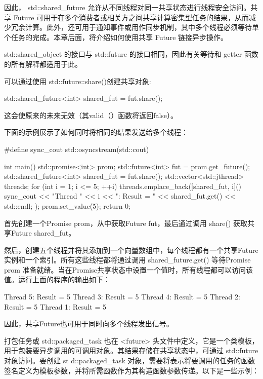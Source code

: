 因此， std::shared\_future 允许从不同线程对同一共享状态进行线程安全访问。共享 Future 可用于在多个消费者或相关方之间共享计算密集型任务的结果，从而减少冗余计算。此外，还可用于通知事件或用作同步机制，其中多个线程必须等待单个任务的完成。本章后面，将介绍如何使用共享 Future 链接异步操作。

std::shared\_object 的接口与 std::future 的接口相同，因此有关等待和 getter 函数的所有解释都适用于此。

可以通过使用 std::future::share()创建共享对象:

\begin{cpp}
std::shared_future<int> shared_fut = fut.share();
\end{cpp}

这会使原来的未来无效（其valid（）函数将返回false）。

下面的示例展示了如何同时将相同的结果发送给多个线程：

\begin{cpp}
#define sync_cout std::osyncstream(std::cout)

int main() {
    std::promise<int> prom;
    std::future<int> fut = prom.get_future();
    std::shared_future<int> shared_fut = fut.share();
    std::vector<std::jthread> threads;
    for (int i = 1; i <= 5; ++i) {
        threads.emplace_back([shared_fut, i]() {
            sync_cout << "Thread " << i << ": Result = "
            << shared_fut.get() << std::endl;
        });
    }
    prom.set_value(5);
    return 0;
}
\end{cpp}

首先创建一个Promise prom，从中获取Future fut，最后通过调用 share() 获取共享Future shared\_fut。

然后，创建五个线程并将其添加到一个向量数组中，每个线程都有一个共享Future实例和一个索引。所有这些线程都将通过调用 shared\_future.get() 等待Promise prom 准备就绪。当在Promise共享状态中设置一个值时，所有线程都可以访问该值。运行上面的程序的输出如下：

\begin{shell}
Thread 5: Result = 5
Thread 3: Result = 5
Thread 4: Result = 5
Thread 2: Result = 5
Thread 1: Result = 5
\end{shell}

因此，共享Future也可用于同时向多个线程发出信号。


打包任务或 std::packaged\_task 也在 <future> 头文件中定义，它是一个类模板，用于包装要异步调用的可调用对象。其结果存储在共享状态中，可通过 std::future 对象访问。要创建 st d::packaged\_task 对象，需要将表示将要调用的任务的函数签名定义为模板参数，并将所需函数作为其构造函数参数传递。以下是一些示例：

